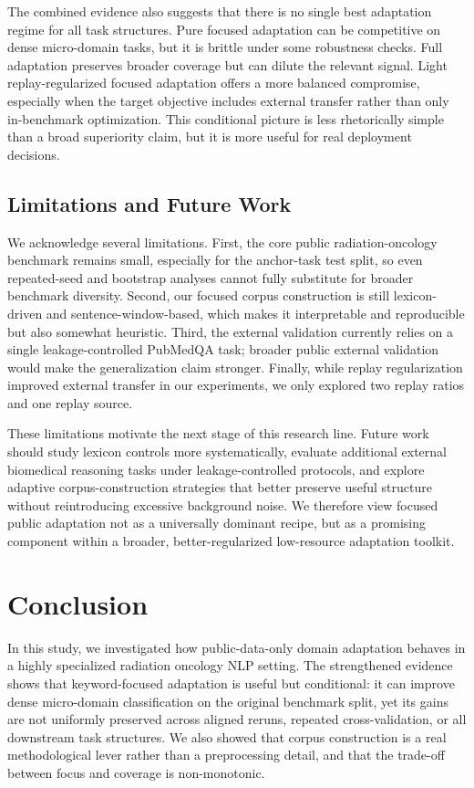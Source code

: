 \documentclass[a4paper,fleqn]{cas-dc}
\begin{document}
The combined evidence also suggests that there is no single best adaptation regime for all task structures. Pure focused adaptation can be competitive on dense micro-domain tasks, but it is brittle under some robustness checks. Full adaptation preserves broader coverage but can dilute the relevant signal. Light replay-regularized focused adaptation offers a more balanced compromise, especially when the target objective includes external transfer rather than only in-benchmark optimization. This conditional picture is less rhetorically simple than a broad superiority claim, but it is more useful for real deployment decisions.

\subsection{Limitations and Future Work}
We acknowledge several limitations. First, the core public radiation-oncology benchmark remains small, especially for the anchor-task test split, so even repeated-seed and bootstrap analyses cannot fully substitute for broader benchmark diversity. Second, our focused corpus construction is still lexicon-driven and sentence-window-based, which makes it interpretable and reproducible but also somewhat heuristic. Third, the external validation currently relies on a single leakage-controlled PubMedQA task; broader public external validation would make the generalization claim stronger. Finally, while replay regularization improved external transfer in our experiments, we only explored two replay ratios and one replay source.

These limitations motivate the next stage of this research line. Future work should study lexicon controls more systematically, evaluate additional external biomedical reasoning tasks under leakage-controlled protocols, and explore adaptive corpus-construction strategies that better preserve useful structure without reintroducing excessive background noise. We therefore view focused public adaptation not as a universally dominant recipe, but as a promising component within a broader, better-regularized low-resource adaptation toolkit.

\section{Conclusion} \label{conclusion and future work}
In this study, we investigated how public-data-only domain adaptation behaves in a highly specialized radiation oncology NLP setting. The strengthened evidence shows that keyword-focused adaptation is useful but conditional: it can improve dense micro-domain classification on the original benchmark split, yet its gains are not uniformly preserved across aligned reruns, repeated cross-validation, or all downstream task structures. We also showed that corpus construction is a real methodological lever rather than a preprocessing detail, and that the trade-off between focus and coverage is non-monotonic.
\end{document}
